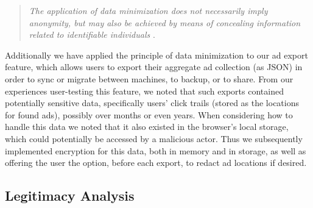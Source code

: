 \documentclass[conference]{IEEEtran}
\begin{document}

\vspace{2mm}
\blockquote{\emph{The application of data minimization does not necessarily imply anonymity, but may also be achieved by means of concealing information related to identifiable individuals} \cite{Gurses-0}.}
\vspace{1mm}

\noindent Additionally we have applied the principle of data minimization to our ad export feature, which allows users to export their aggregate ad collection (as JSON) in order to sync or migrate between machines, to backup, or to share. From our experiences user-testing this feature, we noted that such exports contained potentially sensitive data, specifically users' click trails (stored as the locations for found ads), possibly over months or even years. When considering how to handle this data we noted that it also existed in the browser's local storage, which could potentially be accessed by a malicious actor. Thus we subsequently implemented encryption for this data, both in memory and in storage, as well as offering the user the option, before each export, to redact ad locations if desired.

\subsection{Legitimacy Analysis}
\end{document}
